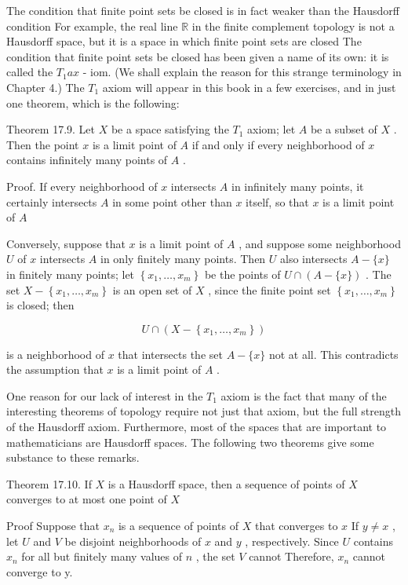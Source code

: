 The condition that finite point sets be closed is in fact weaker than the Hausdorff condition For example, the real line \(\mathbb{R}\) in the finite complement topology is not a Hausdorff space, but it is a space in which finite point sets are closed The condition that finite point sets be closed has been given a name of its own: it is called the \({T}_{1}{ax}\) - iom. (We shall explain the reason for this strange terminology in Chapter 4.) The \({T}_{1}\) axiom will appear in this book in a few exercises, and in just one theorem, which is the following:

Theorem 17.9. Let \(X\) be a space satisfying the \({T}_{1}\) axiom; let \(A\) be a subset of \(X\) . Then the point \(x\) is a limit point of \(A\) if and only if every neighborhood of \(x\) contains infinitely many points of \(A\) .

Proof. If every neighborhood of \(x\) intersects \(A\) in infinitely many points, it certainly intersects \(A\) in some point other than \(x\) itself, so that \(x\) is a limit point of \(A\)

Conversely, suppose that \(x\) is a limit point of \(A\) , and suppose some neighborhood \(U\) of \(x\) intersects \(A\) in only finitely many points. Then \(U\) also intersects \(A - \{ x\}\) in finitely many points; let \(\left\{  {{x}_{1},\ldots ,{x}_{m}}\right\}\) be the points of \(U \cap  \left( {A-\{ x\} }\right)\) . The set \(X - \left\{  {{x}_{1},\ldots ,{x}_{m}}\right\}\) is an open set of \(X\) , since the finite point set \(\left\{  {{x}_{1},\ldots ,{x}_{m}}\right\}\) is closed; then

\[
U \cap  \left( {X - \left\{  {{x}_{1},\ldots ,{x}_{m}}\right\}  }\right)
\]

is a neighborhood of \(x\) that intersects the set \(A - \{ x\}\) not at all. This contradicts the assumption that \(x\) is a limit point of \(A\) .

One reason for our lack of interest in the \({T}_{1}\) axiom is the fact that many of the interesting theorems of topology require not just that axiom, but the full strength of the Hausdorff axiom. Furthermore, most of the spaces that are important to mathematicians are Hausdorff spaces. The following two theorems give some substance to these remarks.

Theorem 17.10. If \(X\) is a Hausdorff space, then a sequence of points of \(X\) converges to at most one point of \(X\)

Proof Suppose that \({x}_{n}\) is a sequence of points of \(X\) that converges to \(x\) If \(y \neq  x\) , let \(U\) and \(V\) be disjoint neighborhoods of \(x\) and \(y\) , respectively. Since \(U\) contains \({x}_{n}\) for all but finitely many values of \(n\) , the set \(V\) cannot Therefore, \({x}_{n}\) cannot converge to y.

